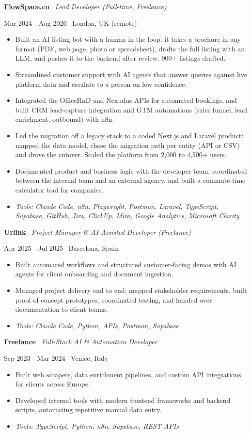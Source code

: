 \documentclass[a4paper,10pt]{article}
\newcommand{\role}[4]{%
 \vspace{2pt}\noindent
 \begin{minipage}[t]{0.70\textwidth}\raggedright\textbf{#1} \textbullet\ \textit{#3}\end{minipage}%
 \hfill
 \begin{minipage}[t]{0.28\textwidth}\raggedleft\footnotesize\color{gray}#2 \textbullet\ #4\end{minipage}%
 \vspace{1pt}%
}
\begin{document}
\role{\href{https://flowspace.co}{FlowSpace.co}}{Mar 2024 - Aug 2026}{Lead Developer (Full-time, Freelance)}{London, UK (remote)}
\begin{itemize}
 \item Built an AI listing bot with a human in the loop: it takes a brochure in any format (PDF, web page, photo or spreadsheet), drafts the full listing with an LLM, and pushes it to the backend after review. 900+ listings drafted.
 \item Streamlined customer support with AI agents that answer queries against live platform data and escalate to a person on low confidence.
 \item Integrated the OfficeRnD and Nexudus APIs for automated bookings, and built CRM lead-capture integration and GTM automations (sales funnel, lead enrichment, outbound) with n8n.
 \item Led the migration off a legacy stack to a coded Next.js and Laravel product: mapped the data model, chose the migration path per entity (API or CSV) and drove the cutover. Scaled the platform from 2,000 to 4,500+ users.
 \item Documented product and business logic with the developer team, coordinated between the internal team and an external agency, and built a commute-time calculator tool for companies.
 \item \textit{Tools: Claude Code, n8n, Playwright, Postman, Laravel, TypeScript, Supabase, GitHub, Jira, ClickUp, Miro, Google Analytics, Microsoft Clarity}
\end{itemize}

\role{Urlink}{Apr 2025 - Jul 2025}{Project Manager \& AI-Assisted Developer (Freelance)}{Barcelona, Spain}
\begin{itemize}
 \item Built automated workflows and structured customer-facing demos with AI agents for client onboarding and document ingestion.
 \item Managed project delivery end to end: mapped stakeholder requirements, built proof-of-concept prototypes, coordinated testing, and handed over documentation to client teams.
 \item \textit{Tools: Claude Code, Python, APIs, Postman, Supabase}
\end{itemize}

\role{Freelance}{Sep 2023 - Mar 2024}{Full-Stack AI \& Automation Developer}{Venice, Italy}
\begin{itemize}
 \item Built web scrapers, data enrichment pipelines, and custom API integrations for clients across Europe.
 \item Developed internal tools with modern frontend frameworks and backend scripts, automating repetitive manual data entry.
 \item \textit{Tools: TypeScript, Python, n8n, Supabase, REST APIs}
\end{itemize}
\end{document}
